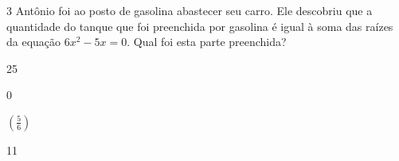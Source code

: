 












\num{3} Antônio foi ao posto de gasolina abastecer seu carro. Ele descobriu
que a quantidade do tanque que foi preenchida por gasolina é igual à
soma das raízes da equação $6x^2 - 5x = 0$. Qual foi esta parte preenchida?

\begin{escolha}[itemsep=0pt]
\item 25
\item 0
\item $(\frac{5}{6})$
\item 11
\end{escolha}






